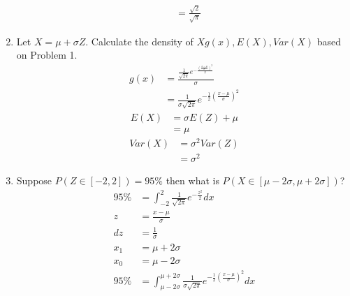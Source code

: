 \documentclass{article}
\begin{document}
\begin{enumerate}
\begin{align*}
                       &= \frac{\sqrt{2}}{\sqrt{\pi}}
            \end{align*}
        \item Let $X = \mu + \sigma Z$. Calculate the density of  $X g(x), E(X), Var(X)$ based on Problem 1.
            \begin{align*}
                g(x) &= \frac{\frac{1}{\sqrt{2\pi}}e^{-\frac{(\frac{x-\mu}{\sigma})^2}{2}}}{\sigma}\\
                     &= \frac{1}{\sigma\sqrt{2\pi}}e^{-\frac{1}{2}(\frac{x-\mu}{\sigma})^2}
            \end{align*}
            \begin{align*}
                E(X) &= \sigma E(Z) + \mu \\
                     &= \mu
            \end{align*}
            \begin{align*}
                Var(X) &= \sigma^2Var(Z) \\
                       &= \sigma^2
            \end{align*}
        \item Suppose $P(Z \in [-2,2]) = 95\%$ then what is $P(X \in [\mu - 2\sigma, \mu + 2\sigma])$?
            \begin{align*}
                95\% &= \int_{-2}^{2}\frac{1}{\sqrt{2\pi}}e^{-\frac{z^2}{2}}dx \\
                z &= \frac{x-\mu}{\sigma}\\
                dz &= \frac{1}{\sigma}\\
                x_1 &= \mu + 2\sigma\\
                x_0 &= \mu - 2\sigma\\
                95\% &= \int_{\mu - 2\sigma}^{\mu + 2\sigma}\frac{1}{\sigma\sqrt{2\pi}}e^{-\frac{1}{2}(\frac{x-\mu}{\sigma})^2}dx
            \end{align*}
    \end{enumerate}
\end{document}
